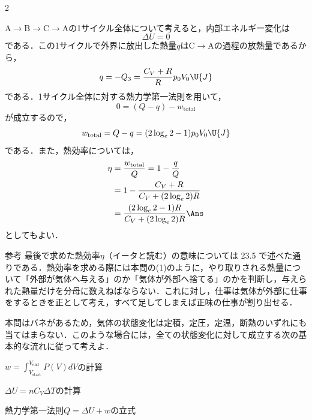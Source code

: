 \begin{multicols}{2}
\begin{komon}
\end{komon}
\begin{bekkai}
$\mathrm{A}\rightarrow\mathrm{B}\rightarrow\mathrm{C}\rightarrow\mathrm{A}$の1サイクル全体について考えると，内部エネルギー変化は
\[\Delta U=0\]
である．この1サイクルで外界に放出した熱量$q$は$\mathrm{C}\rightarrow\mathrm{A}$の過程の放熱量であるから，
\[q=-Q_3=\frac{C_V+R}{R}p_0V_0\U{J}\]
である．1サイクル全体に対する熱力学第一法則を用いて，
\[0=(Q-q)-w_{\mathrm{total}}\]
が成立するので，
\[w_{\mathrm{total}}=Q-q=(2\log_e 2-1)p_0V_0\U{J}\]
である．また，熱効率については，
\[\begin{aligned}
  \eta&=\frac{w_{\mathrm{total}}}{Q}=1-\frac{q}{Q}\\
      &=1-\frac{C_V+R}{C_V+(2\log_e 2)R}\\
      &=\frac{(2\log_e 2-1)R}{C_V+(2\log_e 2)R}\Ans
\end{aligned}\]
としてもよい．
\end{bekkai}
\begin{bsHosoku}{参考}
最後で求めた熱効率$\eta$（イータと読む）の意味については 23.5 で述べた通りである．熱効率を求める際には本問の(1)のように，やり取りされる熱量について「外部が気体へ与える」のか「気体が外部へ捨てる」のかを判断し，{\gtfamily 与えられた熱量だけ}を分母に数えねばならない．これに対し，仕事は気体が外部に仕事をするときを正として考え，すべて足してしまえば正味の仕事が割り出せる．
\end{bsHosoku}

\par\nopagebreak
\begin{sisin}
本問はバネがあるため，気体の状態変化は定積，定圧，定温，断熱のいずれにも当てはまらない．このような場合には，全ての状態変化に対して成立する次の基本的な流れに従って考えよ．
\begin{list}{}{\setlength{\leftmargin}{1.6zw}\setlength{\itemsep}{0.3mm}\setlength{\topsep}{0.6mm}\setlength{\parsep}{0pt}}
\item[\MARU{1}] $w=\displaystyle\int_{V_{\mathrm{start}}}^{V_{\mathrm{end}}}P(V)dV$の計算
\item[\MARU{2}] $\Delta U=nC_V\Delta T$の計算
\item[\MARU{3}] 熱力学第一法則$Q=\Delta U+w$の立式
\end{list}


\end{sisin}
\end{multicols}
